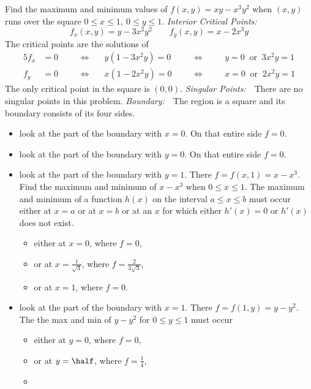 \begin{eg}\label{eg:MXMNabsC}
Find the maximum and minimum values of $f(x,y)=xy-x^3y^2$ when $(x,y)$
runs over the square $0\leqslant x\leqslant 1,\ 0\leqslant y\leqslant 1$.
\soln
\noindent\emph{Interior Critical Points:}\ \
\begin{equation*}
f_x(x,y)=y-3x^2y^2\qquad
f_y(x,y)=x-2x^3y
\end{equation*}
The critical points are the solutions of
\begin{alignat*}{5}
f_x&=0 & &\quad\iff\quad  &y(1-3x^2y)=0 &
&\quad\iff\quad & &y=0 \ \text{ or }\  3x^2y=1 \\
f_y&=0 & &\quad\iff\quad  &x(1-2x^2y)=0 &
&\quad\iff\quad & &x=0 \ \text{ or }\  2x^2y=1
\end{alignat*}
The only critical point in the square is $(0,0)$. %
\smallskip
\noindent\emph{Singular Points:}\ \  There are no singular points in this problem.
\smallskip
\noindent\emph{Boundary:}\ \
The region is a square and its boundary consists of its four sides.
\begin{itemize}
\item look at the part of the boundary with $x=0$. On that entire side $f=0$.
\item look at the part of the boundary with $y=0$. On that entire side $f=0$.
\item look at the part of the boundary with $y=1$. There $f=f(x,1)=x-x^3$.
Find the maximum and minimum of $x-x^3$ when $0\leqslant x\leqslant 1$.
The maximum and minimum of a function $h(x)$ on the interval $a\leqslant x\leqslant b$ must occur either at $x=a$ or at $x=b$ or at an $x$ for which either $h'(x)=0$ or $h'(x)$ does not exist.
\begin{itemize}\itemsep1pt \parskip0pt \parsep0pt
\item
either at $x=0$, where $f=0$,
\item
or at $x=\tfrac{1}{\sqrt{3}}$, where $f=\tfrac{2}{3\sqrt{3}}$,
\item
or at $x=1$, where $f=0$.
\end{itemize}
\item look at the part of the boundary with $x=1$. There $f=f(1,y)=y-y^2$.
The the max and min of $y-y^2$ for $0\leqslant y\leqslant 1$ must occur
\begin{itemize}\itemsep1pt \parskip0pt \parsep0pt
\item
either at $y=0$, where $f=0$,
\item
or at $y=\half$,  where $f=\tfrac{1}{4}$,
\item

\end{itemize}
\end{itemize}
\end{eg}
